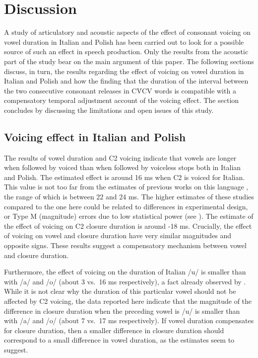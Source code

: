 \documentclass[charis]{glossa}
\begin{document}
\hypertarget{discussion}{%
\section{Discussion}\label{discussion}}

\label{s:discussion}

A study of articulatory and acoustic aspects of the effect of consonant
voicing on vowel duration in Italian and Polish has been carried out to
look for a possible source of such an effect in speech production. Only
the results from the acoustic part of the study bear on the main
argument of this paper. The following sections discuss, in turn, the
results regarding the effect of voicing on vowel duration in Italian and
Polish and how the finding that the duration of the interval between the
two consecutive consonant releases in CV́CV words is compatible with a
compensatory temporal adjustment account of the voicing effect. The
section concludes by discussing the limitations and open issues of this
study.

\hypertarget{voicing-effect-in-italian-and-polish}{%
\subsection{Voicing effect in Italian and
Polish}\label{voicing-effect-in-italian-and-polish}}

The results of vowel duration and C2 voicing indicate that vowels are
longer when followed by voiced than when followed by voiceless stops
both in Italian and Polish. The estimated effect is around 16 ms when C2
is voiced for Italian. This value is not too far from the estimates of
previous works on this language
\citep{caldognetto1979, farnetani1986, esposito2002}, the range of which
is between 22 and 24 ms. The higher estimates of these studies compared
to the one here could be related to differences in experimental design,
or Type M (magnitude) errors due to low statistical power (see
\citealt{kirby2018}). The estimate of the effect of voicing on C2
closure duration is around -18 ms. Crucially, the effect of voicing on
vowel and closure duration have very similar magnitudes and opposite
signs. These results suggest a compensatory mechanism between vowel and
closure duration.

Furthermore, the effect of voicing on the duration of Italian /u/ is
smaller than with /a/ and /o/ (about 3 vs.~16 ms respectively), a fact
already observed by \citet{ferrero1978}. While it is not clear why the
duration of this particular vowel should not be affected by C2 voicing,
the data reported here indicate that the magnitude of the difference in
closure duration when the preceding vowel is /u/ is smaller than with
/a/ and /o/ (about 7 vs.~17 ms respectively). If vowel duration
compensates for closure duration, then a smaller difference in closure
duration should correspond to a small difference in vowel duration, as
the estimates seem to suggest.
\end{document}
